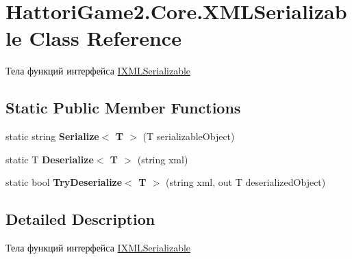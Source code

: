 \hypertarget{class_hattori_game2_1_1_core_1_1_x_m_l_serializable}{}\section{Hattori\+Game2.\+Core.\+X\+M\+L\+Serializable Class Reference}
\label{class_hattori_game2_1_1_core_1_1_x_m_l_serializable}


Тела функций интерфейса \hyperlink{interface_hattori_game2_1_1_core_1_1_i_x_m_l_serializable}{I\+X\+M\+L\+Serializable}  


\subsection*{Static Public Member Functions}
\begin{DoxyCompactItemize}
\item 
\hypertarget{class_hattori_game2_1_1_core_1_1_x_m_l_serializable_ad17a2ee6307ef12e87042d33adf96d23}{}static string {\bfseries Serialize$<$ T $>$} (T serializable\+Object)\label{class_hattori_game2_1_1_core_1_1_x_m_l_serializable_ad17a2ee6307ef12e87042d33adf96d23}

\item 
\hypertarget{class_hattori_game2_1_1_core_1_1_x_m_l_serializable_ab99f8bf6f9e180f63c36c0e54d720e6a}{}static T {\bfseries Deserialize$<$ T $>$} (string xml)\label{class_hattori_game2_1_1_core_1_1_x_m_l_serializable_ab99f8bf6f9e180f63c36c0e54d720e6a}

\item 
\hypertarget{class_hattori_game2_1_1_core_1_1_x_m_l_serializable_ad1d1b492ef8780e263da5bc7fae41884}{}static bool {\bfseries Try\+Deserialize$<$ T $>$} (string xml, out T deserialized\+Object)\label{class_hattori_game2_1_1_core_1_1_x_m_l_serializable_ad1d1b492ef8780e263da5bc7fae41884}

\end{DoxyCompactItemize}


\subsection{Detailed Description}
Тела функций интерфейса \hyperlink{interface_hattori_game2_1_1_core_1_1_i_x_m_l_serializable}{I\+X\+M\+L\+Serializable} 

